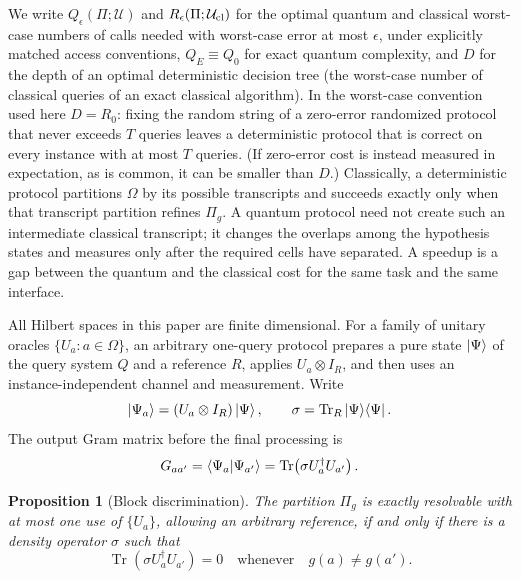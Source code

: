 \documentclass[
  aps,
  pra,
  reprint,
  nofootinbib
]{revtex4-2}
\newtheorem{proposition}{Proposition}
\begin{document}
We write \(Q_\epsilon(\Pi;\mathcal U)\) and \(R_\epsilon(\Pi;\mathcal U_{\rm
cl})\) for the optimal quantum and classical worst-case numbers of calls needed
with worst-case error at most \(\epsilon\), under explicitly matched access
conventions, \(Q_E\equiv Q_0\) for exact quantum complexity, and \(D\) for the
depth of an optimal deterministic decision tree (the worst-case number of
classical queries of an exact classical algorithm). In the worst-case
convention used here \(D=R_0\): fixing the random string of a zero-error
randomized protocol that never exceeds \(T\) queries leaves a deterministic
protocol that is correct on every instance with at most \(T\) queries. (If
zero-error cost is instead measured in expectation, as is common, it can be
smaller than \(D\).) Classically, a
deterministic protocol partitions \(\Omega\) by its possible transcripts and
succeeds exactly only when that transcript partition refines \(\Pi_g\). A
quantum protocol need not create such an intermediate classical transcript; it
changes the overlaps among the hypothesis states and measures only after the
required cells have separated. A speedup is a gap between the quantum and the
classical cost for the same task and the same interface.

All Hilbert spaces in this paper are finite dimensional. For a family of
unitary oracles \(\{U_a:a\in\Omega\}\), an arbitrary one-query protocol
prepares a pure state \(\ket\Psi\) of the query system \(Q\) and a
reference \(R\), applies \(U_a\otimes I_R\), and then uses an
instance-independent channel and measurement. Write
\begin{equation}
 \ket{\Psi_a}=(U_a\otimes I_R)\ket\Psi,
 \qquad
 \sigma=\operatorname{Tr}_R\ket\Psi\!\bra\Psi .
\end{equation}
The output Gram matrix before the final processing is
\begin{equation}
 G_{aa'}=\braket{\Psi_a|\Psi_{a'}}
 =\operatorname{Tr}\!\left(\sigma U_a^\dagger U_{a'}\right).
 \label{eq:gram}
\end{equation}

\begin{proposition}[Block discrimination]\label{prop:block}
The partition \(\Pi_g\) is exactly resolvable with at most one use of
\(\{U_a\}\), allowing an arbitrary reference, if and only if there is a density
operator \(\sigma\) such that
\begin{equation}
 \operatorname{Tr}\!\left(\sigma U_a^\dagger U_{a'}\right)=0
 \quad\text{whenever}\quad g(a)\ne g(a').
 \label{eq:criterion}
\end{equation}
\end{proposition}
\end{document}
